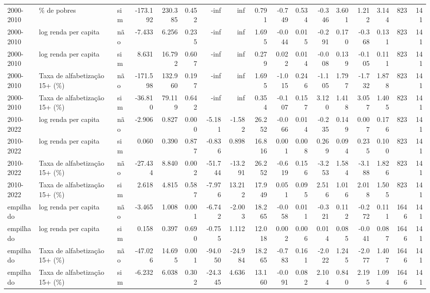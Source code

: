 \begin{table}
\begin{tabular}{lllrrrrrrrrrrrrrr}
2000-2010 & \% de pobres & sim & -173.192 & 230.385 & 0.452 & -inf & inf & 0.791 & -0.749 & 0.534 & -0.346 & 3.601 & 1.212 & 3.144 & 823 & 141 \\
2000-2010 & log renda per capita & não & -7.433 & 6.256 & 0.235 & -inf & inf & 1.695 & -0.044 & 0.015 & -0.291 & 0.170 & -0.368 & 0.131 & 823 & 141 \\
2000-2010 & log renda per capita & sim & 8.631 & 16.792 & 0.607 & -inf & inf & 0.279 & 0.022 & 0.014 & -0.008 & 0.139 & -0.105 & 0.111 & 823 & 141 \\
2000-2010 & Taxa de alfabetização 15+ (\%) & não & -171.598 & 132.960 & 0.197 & -inf & inf & 1.695 & -1.015 & 0.246 & -1.105 & 1.797 & -1.732 & 1.878 & 823 & 141 \\
2000-2010 & Taxa de alfabetização 15+ (\%) & sim & -36.810 & 79.119 & 0.642 & -inf & inf & 0.354 & -0.107 & 0.157 & 3.120 & 1.418 & 3.057 & 1.405 & 823 & 141 \\
2010-2022 & log renda per capita & não & -2.906 & 0.827 & 0.000 & -5.181 & -1.582 & 26.252 & -0.066 & 0.014 & -0.235 & 0.149 & 0.007 & 0.176 & 823 & 141 \\
2010-2022 & log renda per capita & sim & 0.060 & 0.390 & 0.877 & -0.836 & 0.898 & 16.816 & 0.001 & 0.008 & 0.269 & 0.094 & 0.235 & 0.100 & 823 & 141 \\
2010-2022 & Taxa de alfabetização 15+ (\%) & não & -27.434 & 8.840 & 0.002 & -51.744 & -13.291 & 26.252 & -0.619 & 0.156 & -3.253 & 1.584 & -3.188 & 1.826 & 823 & 141 \\
2010-2022 & Taxa de alfabetização 15+ (\%) & sim & 2.618 & 4.815 & 0.587 & -7.976 & 13.212 & 17.949 & 0.051 & 0.095 & 2.516 & 1.016 & 2.018 & 1.505 & 823 & 141 \\
empilhado & log renda per capita & não & -3.465 & 1.008 & 0.001 & -6.742 & -2.003 & 18.265 & -0.058 & 0.011 & -0.321 & 0.112 & -0.272 & 0.111 & 1646 & 141 \\
empilhado & log renda per capita & sim & 0.158 & 0.397 & 0.690 & -0.755 & 1.112 & 12.018 & 0.002 & 0.006 & 0.014 & 0.085 & -0.041 & 0.087 & 1646 & 141 \\
empilhado & Taxa de alfabetização 15+ (\%) & não & -47.026 & 14.695 & 0.001 & -94.050 & -24.984 & 18.265 & -0.783 & 0.161 & -2.022 & 1.245 & -2.077 & 1.407 & 1646 & 141 \\
empilhado & Taxa de alfabetização 15+ (\%) & sim & -6.232 & 6.038 & 0.302 & -24.345 & 4.636 & 13.160 & -0.091 & 0.082 & 2.104 & 0.840 & 2.195 & 1.094 & 1646 & 141 \\
\bottomrule
\end{tabular}
\end{table}
